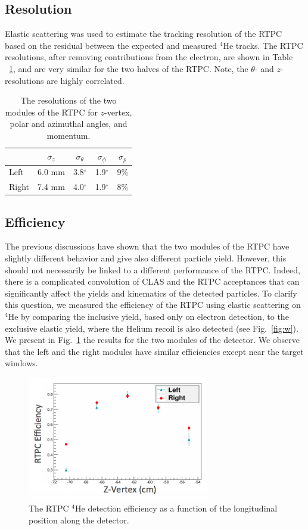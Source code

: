 \documentclass[preprint,5p]{elsarticle}
\begin{document}
\subsection{Resolution}
Elastic scattering was used to estimate the tracking resolution of the RTPC 
based on the residual between the expected and measured $^4$He tracks.  The RTPC
resolutions, after removing contributions from the electron, are shown in Table
~\ref{tab:reso}, and are very similar for the two halves of the RTPC.  Note, the
$\theta$- and $z$-resolutions are highly correlated.
\begin{table}[htbp]
\begin{center}
\begin{tabular}{|l|cccc|}
  \hline
& $\sigma_{z}$ &  $\sigma_{\theta}$ & $\sigma_{\phi}$ & $\sigma_{p}$\\
\hline
Left &  6.0 mm & 3.8$^{\circ}$ & 1.9$^{\circ}$ & 9$\%$ \\
Right & 7.4 mm & 4.0$^{\circ}$ & 1.9$^{\circ}$ & 8$\%$\\
\hline
\end{tabular}
\caption{The resolutions of the two modules of the RTPC for $z$-vertex, polar and azimuthal angles, and momentum.}
\label{tab:reso}
\end{center}
\end{table}


\subsection{Efficiency}
The previous discussions have shown that the two modules of the RTPC have 
slightly different behavior and give also different particle yield. However, 
this should not necessarily be linked to a different performance of the RTPC. 
Indeed, there is a complicated convolution of CLAS and the RTPC acceptances 
that can significantly affect the yields and kinematics of the detected 
particles. To clarify this question, we measured the efficiency of the RTPC
using elastic scattering on $^4$He by comparing the inclusive yield, based
only on electron detection, to the exclusive elastic yield, where the Helium
recoil is also detected (see Fig.~\ref{fig:w}). We present in Fig.~\ref{fig:rtpc_eff}
the results for the two modules of the detector. We observe that the left and 
the right modules have similar efficiencies except near the target windows.

\begin{figure}[tb]
\centering
\includegraphics[width=8cm]{fig/tpceff.png}
\caption{The RTPC $^4$He detection efficiency as a function of the longitudinal 
   position along the detector.
 \label{fig:rtpc_eff}}
 \end{figure}
\end{document}
